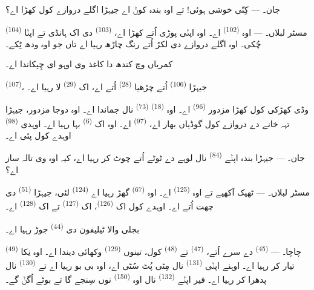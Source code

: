\textsc{جان}۔ --- کِنّی خوشی ہوئی! تے اوہ بندہ کوݨ اے جیہڑا اگلے دروازے کول کھڑا
اے؟

\VUsaut{3.0mm}
\VUsaut{3.0mm}

\textsc{مسٹر لبلاں}۔ --- اوہ  \textsuperscript{(102)} اے۔ اوہ اپݨی
پوڑی اُتے کھڑا اے،  \textsuperscript{(103)} دی اک ہانڈی تے اپݨا
 \textsuperscript{(104)} چُکی۔ اوہ اگلے دروازے دی لکڑ اُتے رنگ چاڑھ
رہیا اے تاں جو اوہ ودھ ٹِکے۔

کمریاں وچ کندھ دا کاغذ وی اوہو ای چِپکاندا اے۔

 \textsuperscript{(107)}، جیہڑا 
\textsuperscript{(106)} اُتے چڑھیا  \textsuperscript{(28)} اُتے اے،
اک  \textsuperscript{(29)} لا رہیا اے۔

وڈی کھڑکی کول کھڑا مزدور  \textsuperscript{(96)} اے۔ اوہ
 \textsuperscript{(18)}  \textsuperscript{(73)} نال
جماندا اے۔ اوہ دوجا مزدور، جیہڑا تہہ خانے دے دروازے کول گوڈیاں بھار اے،
 \textsuperscript{(97)} اے۔ اوہ اک  \textsuperscript{(6)}
بہا رہیا اے۔ اوہدی  \textsuperscript{(98)} اوہدے کول پئی اے۔

\textsc{جان}۔ --- جیہڑا بندہ اپݨے  \textsuperscript{(84)} نال لوہے
دے ٹوٹے اُتے چوٹ کر رہیا اے، کیہ اوہ وی تالہ ساز اے؟

\textsc{مسٹر لبلاں}۔ --- ٹھیک آکھیے تے اوہ  \textsuperscript{(125)}
اے۔ اوہ  \textsuperscript{(67)} گھڑ رہیا اے
 \textsuperscript{(124)} لئی، جیہڑا 
\textsuperscript{(51)} دی چھت اُتے اے۔ اوہدے کول اک  \textsuperscript{(126)}،
اک  \textsuperscript{(127)} تے اک  \textsuperscript{(128)}
اے۔

بجلی والا ٹیلیفون دی  \textsuperscript{(44)} جوڑ رہیا اے۔

\VUsaut{3.0mm}

\textsc{چاچا}۔ ---  \textsuperscript{(45)} دے سرے اُتے،
 \textsuperscript{(47)} تے  \textsuperscript{(48)}
کول، تینوں  \textsuperscript{(129)} وکھائی دیندا اے۔ اوہ نِکا
 \textsuperscript{(49)} تیار کر رہیا اے۔ اوہنے اپݨی 
\textsuperscript{(131)} نال مِٹی پُٹ سُٹی اے، اوہ بی بو رہیا اے تے 
\textsuperscript{(130)} نال پدھرا کر رہیا اے۔ فیر اپݨے 
\textsuperscript{(132)} نال اوہ  \textsuperscript{(150)} نوں سِنجے گا
تے بوٹے اُگݨ گے۔

